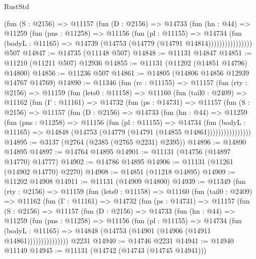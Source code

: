 \begin{lexlean}{RustStd}
\begin{coremodule}
                  (fun (S : @2156) =>
                  @11157
                    (fun (D : @2156) =>
                    @14733
                      (fun (hn : @44) =>
                      @11259
                        (fun (pns : @11258) =>
                        @11156
                          (fun (pl : @11155) =>
                          @14734
                            (fun (bodyL : @11165) =>
                            @14739 (@14753 (@14779 (@14791 @14814))))))))))))))))
    @507
@14847 := @14735 (@11148 @507)
@14848 := @11131 @14847
@14851 := @11210 (@11211 @507) @12936
@14855 := @11131 (@11202 (@14851 @14796) @14800)
@14856 := @11236 @507
@14861 := @14805 (@14806 @14856 @12939 @14767 @14769)
@14890 := @11346
    (fun (rc : @11155) =>
    @11157
      (fun (rty : @2156) =>
      @11159
        (fun (lets0 : @11158) =>
        @11160
          (fun (tail0 : @2409) =>
          @11162
            (fun (Γ : @11161) =>
            @14732
              (fun (ps : @14731) =>
              @11157
                (fun (S : @2156) =>
                @11157
                  (fun (D : @2156) =>
                  @14733
                    (fun (hn : @44) =>
                    @11259
                      (fun (pns : @11258) =>
                      @11156
                        (fun (pl : @11155) =>
                        @14734
                          (fun (bodyL : @11165) =>
                          @14848 (@14753 (@14779 (@14791 (@14855 @14861))))))))))))))))
@14895 := @3137 (@2764 (@2385 (@2765 @2231) @2395))
@14896 := @14890 @14895
@14897 := @14764 @14895
@14901 := @11131 (@14756 (@14897 @14770) @14777)
@14902 := @14786 @14895
@14906 := @11131 (@11261 (@14902 @14770) @2270)
@14908 := @14851 (@11218 @14895)
@14909 := @11202 @14908
@14911 := @11131 (@14909 @14800)
@14939 := @11349
    (fun (rty : @2156) =>
    @11159
      (fun (lets0 : @11158) =>
      @11160
        (fun (tail0 : @2409) =>
        @11162
          (fun (Γ : @11161) =>
          @14732
            (fun (ps : @14731) =>
            @11157
              (fun (S : @2156) =>
              @11157
                (fun (D : @2156) =>
                @14733
                  (fun (hn : @44) =>
                  @11259
                    (fun (pns : @11258) =>
                    @11156
                      (fun (pl : @11155) =>
                      @14734
                        (fun (bodyL : @11165) =>
                        @14848 (@14753 (@14901 (@14906 (@14911 @14861)))))))))))))))
    @2231
@14940 := @14746 @2231
@14941 := @14940 @11149
@14945 := @11131 (@14742 (@14743 (@14745 @14941)))

\end{coremodule}
\end{lexlean}
